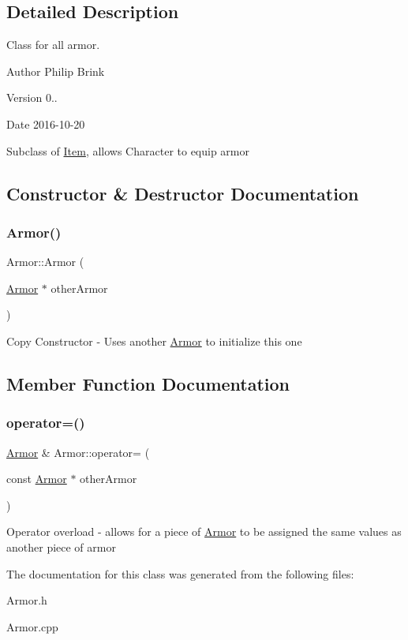 \subsection{Detailed Description}
Class for all armor. 

\begin{DoxyAuthor}{Author}
Philip Brink 
\end{DoxyAuthor}
\begin{DoxyVersion}{Version}
0.. 
\end{DoxyVersion}
\begin{DoxyDate}{Date}
2016-\/10-\/20
\end{DoxyDate}
Subclass of \hyperlink{class_item}{Item}, allows Character to equip armor 

\subsection{Constructor \& Destructor Documentation}
\hypertarget{class_armor_abee983c0e4e8fd5a5d3fccebc6d079dc}{}\label{class_armor_abee983c0e4e8fd5a5d3fccebc6d079dc} 
\subsubsection{\texorpdfstring{Armor()}{Armor()}}
{\footnotesize\ttfamily Armor\+::\+Armor (\begin{DoxyParamCaption}\item[{\hyperlink{class_armor}{Armor} $\ast$}]{other\+Armor }\end{DoxyParamCaption})}

Copy Constructor -\/ Uses another \hyperlink{class_armor}{Armor} to initialize this one 

\subsection{Member Function Documentation}
\hypertarget{class_armor_a167690954e4ccd6c4fd9adfed24bc132}{}\label{class_armor_a167690954e4ccd6c4fd9adfed24bc132} 
\subsubsection{\texorpdfstring{operator=()}{operator=()}}
{\footnotesize\ttfamily \hyperlink{class_armor}{Armor} \& Armor\+::operator= (\begin{DoxyParamCaption}\item[{const \hyperlink{class_armor}{Armor} $\ast$}]{other\+Armor }\end{DoxyParamCaption})}

Operator overload -\/ allows for a piece of \hyperlink{class_armor}{Armor} to be assigned the same values as another piece of armor 

The documentation for this class was generated from the following files\+:\begin{DoxyCompactItemize}
\item 
Armor.\+h\item 
Armor.\+cpp\end{DoxyCompactItemize}
